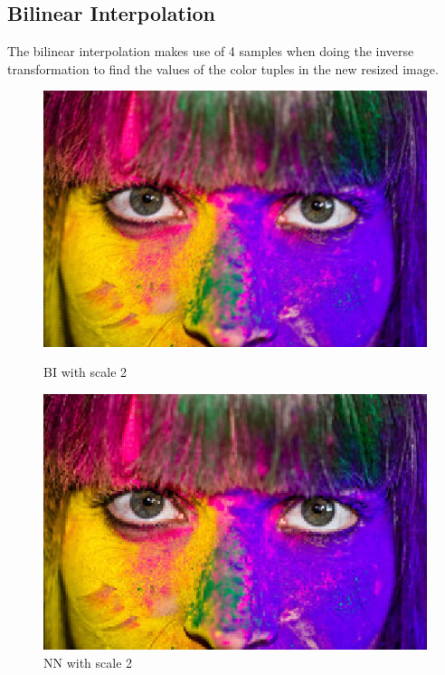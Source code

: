 \documentclass{article}
\begin{document}
\subsection{Bilinear Interpolation}
The bilinear interpolation makes use of 4 samples when doing the inverse transformation to find the values of the color tuples in the new resized image.

\begin{figure}[h!]
\centering
  \begin{minipage}[b]{0.45\textwidth}
    \includegraphics[width=\textwidth]{BI_2.png}
    \caption{BI with scale 2}
  \end{minipage}
  \hfill
  \begin{minipage}[b]{0.45\textwidth}
    \includegraphics[width=\textwidth]{NN_2.png}
    \caption{NN with scale 2}
  \end{minipage}
\end{figure}
\end{document}
